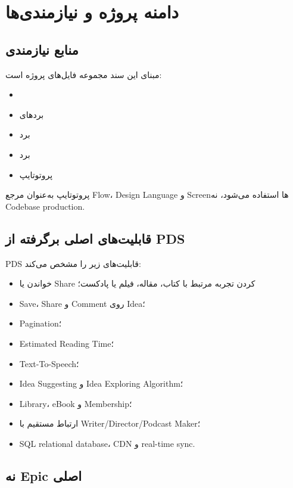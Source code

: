 
\chapter{دامنه پروژه و نیازمندی‌ها}

\section{منابع نیازمندی}

مبنای این سند مجموعه فایل‌های پروژه است:
\begin{itemize}
  \item {}
  \item بردهای 
  \item برد 
  \item برد 
  \item پروتوتایپ 
\end{itemize}

پروتوتایپ به‌عنوان مرجع Flow، Design Language و Screenها استفاده می‌شود، نه Codebase production.

\section{قابلیت‌های اصلی برگرفته از PDS}

\begin{sourcebox}
PDS قابلیت‌های زیر را مشخص می‌کند:
\begin{itemize}
  \item خواندن یا Share کردن تجربه مرتبط با کتاب، مقاله، فیلم یا پادکست؛
  \item Save، Share و Comment روی Idea؛
  \item Pagination؛
  \item Estimated Reading Time؛
  \item Text-To-Speech؛
  \item Idea Suggesting و Idea Exploring Algorithm؛
  \item Library، eBook و Membership؛
  \item ارتباط مستقیم با Writer/Director/Podcast Maker؛
  \item SQL relational database، CDN و real-time sync.
\end{itemize}
\end{sourcebox}

\section{نه Epic اصلی}

